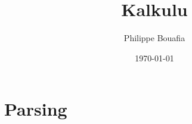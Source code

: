 \documentclass[a4paper, 11pt]{report}
\begin{document}
\title{Kalkulu}
\author{Philippe Bouafia}
\date{\today}

\maketitle{}
\tableofcontents{}

\chapter{Parsing}

\end{document}
